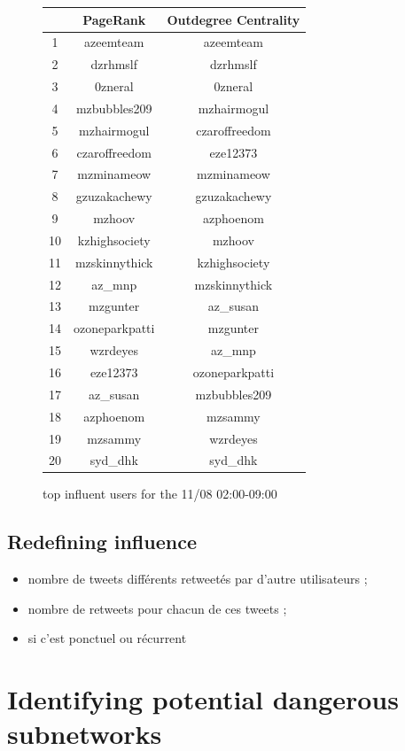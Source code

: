 \documentclass[a4paper,12pt]{report}
\begin{document}
\begin{figure}[H]
  \centering
\begin{tabular}{|c|c|c|}
\hline
~ & PageRank & Outdegree Centrality\\ \hline
1 & azeemteam & azeemteam \\ \hline
2 & dzrhmslf & dzrhmslf \\ \hline
3 & 0zneral & 0zneral \\ \hline
4 & mzbubbles209 & mzhairmogul \\ \hline
5 & mzhairmogul & czaroffreedom \\ \hline
6 & czaroffreedom & eze12373 \\ \hline
7 & mzminameow & mzminameow \\ \hline
8 & gzuzakachewy & gzuzakachewy \\ \hline
9 & mzhoov & azphoenom \\ \hline
10 & kzhighsociety & mzhoov \\ \hline
11 & mzskinnythick & kzhighsociety \\ \hline
12 & az\_mnp & mzskinnythick \\ \hline
13 & mzgunter & az\_susan \\ \hline
14 & ozoneparkpatti & mzgunter \\ \hline
15 & wzrdeyes & az\_mnp \\ \hline
16 & eze12373 & ozoneparkpatti \\ \hline
17 & az\_susan & mzbubbles209 \\ \hline
18 & azphoenom & mzsammy \\ \hline
19 & mzsammy & wzrdeyes \\ \hline
20 & syd\_dhk & syd\_dhk\\ \hline
\hline
\end{tabular}
\caption{top influent users for the 11/08 02:00-09:00}
\end{figure}
\subsection{Redefining influence}
\begin{itemize}
\item nombre de tweets différents retweetés par d'autre utilisateurs ;
\item nombre de retweets pour chacun de ces tweets ;
\item si c'est ponctuel ou récurrent
\end{itemize}

\section{Identifying potential dangerous subnetworks}
\end{document}
